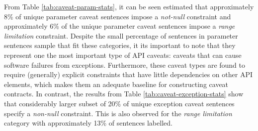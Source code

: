 From Table \ref{tab:caveat-param-stats}, it can be seen estimated that approximately 8\% of unique parameter caveat sentences impose a \textit{not-null} constraint and approximately 6\% of the unique parameter caveat sentences impose a \textit{range limitation} constraint. Despite the small percentage of sentences in parameter sentences sample that fit these categories, it its important to note that they represent one the most important type of API caveats: caveats that can cause software failures from exceptions. Furthermore, these caveat types are found to require (generally) explicit constraints that have little dependencies on other API elements, which makes them an adequate baseline for constructing caveat contracts. In contrast, the results from Table \ref{tab:caveat-exception-stats} show that considerably larger subset of 20\% of unique exception caveat sentences specify a \textit{non-null} constraint. This is also observed for the \textit{range limitation} category with approximately 13\% of sentences labelled. \\

